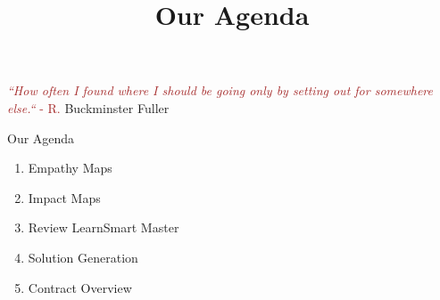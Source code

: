 \documentclass{ximera}
\title{Our Agenda}
\begin{document}
\begin{abstract}

\end{abstract}
\maketitle

\textcolor{brown}{\emph{``How often I found where I should be going only by setting out for somewhere else.``} - R.} Buckminster Fuller

Our Agenda
\begin{enumerate}
  \item Empathy Maps
  \item Impact Maps
  \item Review LearnSmart Master
  \item Solution Generation
  \item Contract Overview
\end{enumerate}
\end{document}
